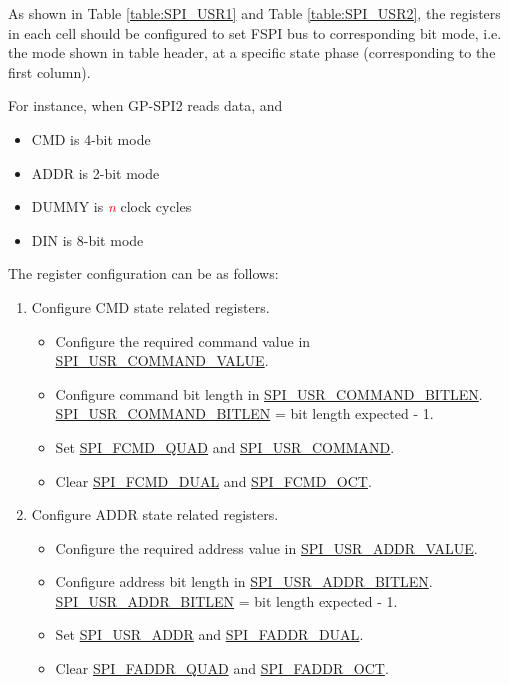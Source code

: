 \documentclass[main\_\_EN.tex]{subfiles}
\begin{document}
As shown in Table \ref{table:SPI_USR1} and Table \ref{table:SPI_USR2}, the registers in each cell should be configured to set FSPI bus to corresponding bit mode, i.e. the mode shown in table header, at a specific state phase (corresponding to the first column).

For instance, when GP-SPI2 reads data, and
\begin{itemize}
    \item CMD is 4-bit mode
    \item ADDR is 2-bit mode
    \item DUMMY is \textcolor{red}{\it{n}} clock cycles
    \item DIN is 8-bit mode
\end{itemize}
The register configuration can be as follows:

\begin{enumerate}
    \item Configure CMD state related registers.
        \begin{itemize}
            \item Configure the required command value in \hyperref[fielddesc:SPIUSRCOMMANDVALUE]{SPI\_USR\_COMMAND\_VALUE}.
            \item Configure command bit length in \hyperref[fielddesc:SPIUSRCOMMANDBITLEN]{SPI\_USR\_COMMAND\_BITLEN}. \hyperref[fielddesc:SPIUSRCOMMANDBITLEN]{SPI\_USR\_COMMAND\_BITLEN} = bit length expected - 1.
            \item Set \hyperref[fielddesc:SPIFCMDQUAD]{SPI\_FCMD\_QUAD} and \hyperref[fielddesc:SPIUSRCOMMAND]{SPI\_USR\_COMMAND}.
            \item Clear \hyperref[fielddesc:SPIFCMDDUAL]{SPI\_FCMD\_DUAL} and \hyperref[fielddesc:SPIFCMDOCT]{SPI\_FCMD\_OCT}.
        \end{itemize}

    \item Configure ADDR state related registers.
        \begin{itemize}
            \item Configure the required address value in \hyperref[fielddesc:SPIUSRADDRVALUE]{SPI\_USR\_ADDR\_VALUE}.
            \item Configure address bit length in \hyperref[fielddesc:SPIUSRADDRBITLEN]{SPI\_USR\_ADDR\_BITLEN}. \hyperref[fielddesc:SPIUSRADDRBITLEN]{SPI\_USR\_ADDR\_BITLEN} = bit length expected - 1.
            \item Set \hyperref[fielddesc:SPIUSRADDR]{SPI\_USR\_ADDR} and \hyperref[fielddesc:SPIFADDRDUAL]{SPI\_FADDR\_DUAL}.
            \item Clear \hyperref[fielddesc:SPIFADDRQUAD]{SPI\_FADDR\_QUAD} and \hyperref[fielddesc:SPIFADDROCT]{SPI\_FADDR\_OCT}.
        \end{itemize}


\end{enumerate}
\end{document}
